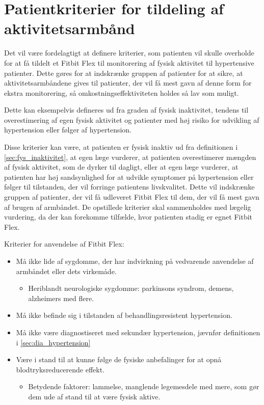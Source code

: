 \section{Patientkriterier for tildeling af aktivitetsarmbånd} \label{sec:kriterier}

Det vil være fordelagtigt at definere kriterier, som patienten vil skulle overholde for at få tildelt et Fitbit Flex til monitorering af fysisk aktivitet til hypertensive patienter. Dette gøres for at indskrænke gruppen af patienter for at sikre, at aktivitetsarmbåndene gives til patienter, der vil få mest gavn af denne form for ekstra monitorering, så omkostningseffektiviteten holdes så lav som muligt.

Dette kan eksempelvis defineres ud fra graden af fysisk inaktivitet, tendens til overestimering af egen fysisk aktivitet og patienter med høj risiko for udvikling af hypertension eller følger af hypertension. 

Disse kriterier kan være, at patienten er fysisk inaktiv ud fra definitionen i \autoref{sec:fys_inaktivitet}, at egen læge vurderer, at patienten overestimerer mængden af fysisk aktivitet, som de dyrker til dagligt, eller at egen læge vurderer, at patienten har høj sandsynlighed for at udvikle symptomer på hypertension eller følger til tilstanden, der vil forringe patientens livskvalitet. Dette vil indskrænke gruppen af patienter, der vil få udleveret Fitbit Flex til dem, der vil få mest gavn af brugen af armbåndet. 
De opstillede kriterier skal sammenholdes med lægelig vurdering, da der kan forekomme tilfælde, hvor patienten stadig er egnet Fitbit Flex. 

Kriterier for anvendelse af Fitbit Flex:
\begin{itemize}
\item Må ikke lide af sygdomme, der har indvirkning på vedvarende anvendelse af armbåndet eller dets virkemåde. 
	\begin{itemize}
	\item Heriblandt neurologiske sygdomme: parkinsons syndrom, demens, alzheimers med flere.
	\end{itemize}

\item Må ikke befinde sig i tilstanden af behandlingsresistent hypertension. 

\item Må ikke være diagnostiseret med sekundær hypertension, jævnfør definitionen i \autoref{sec:dia_hypertension} %

\item Være i stand til at kunne følge de fysiske anbefalinger for at opnå blodtryksreducerende effekt. 
	\begin{itemize}
	\item Betydende faktorer: lammelse, manglende legemesdele med mere, som gør dem ude af stand til at være fysisk aktive. 
	\end{itemize}  

\end{itemize}




